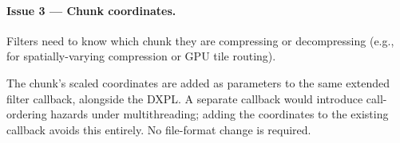 \documentclass[11pt,letterpaper]{article}
\renewcommand{\_}{\oldtextunderscore\allowbreak}
\begin{document}
\paragraph{Issue 3 --- Chunk coordinates.}
Filters need to know which chunk they are compressing or decompressing
(e.g., for spatially-varying compression or GPU tile routing).

The chunk's scaled coordinates are added as parameters to the same
extended filter callback, alongside the DXPL.  A separate callback
would introduce call-ordering hazards under multithreading; adding the
coordinates to the existing callback avoids this entirely.
No file-format change is required.
\end{document}
